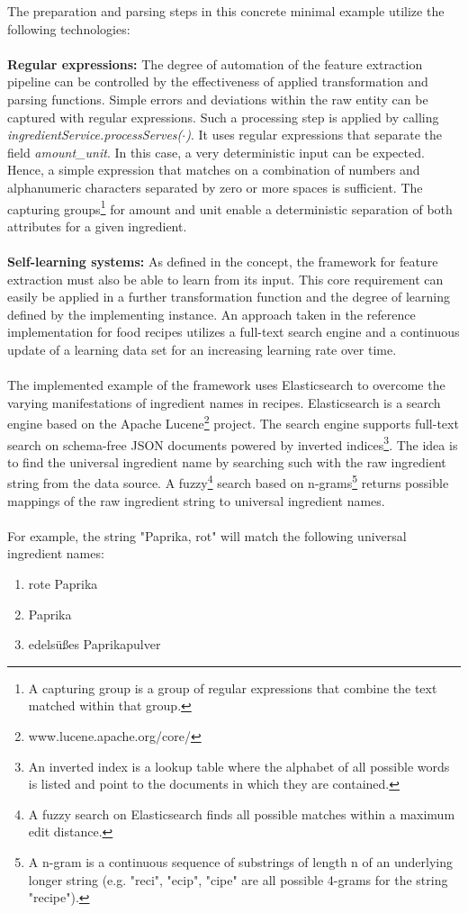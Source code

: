 \noindent The preparation and parsing steps in this concrete minimal example utilize the following technologies:
\\\\
\textbf{Regular expressions:}
The degree of automation of the feature extraction pipeline can be controlled by the effectiveness of applied transformation and parsing functions. Simple errors and deviations within the raw entity can be captured with regular expressions. Such a processing step is applied by calling \textit{ingredientService.processServes($\cdot$)}. It uses regular expressions that separate the field \textit{amount\_unit}. In this case, a very deterministic input can be expected. Hence, a simple expression that matches on a combination of numbers and alphanumeric characters separated by zero or more spaces is sufficient. The capturing groups\footnote{A capturing group is a group of regular expressions that combine the text matched within that group.} for amount and unit enable a deterministic separation of both attributes for a given ingredient.
\\\\
\textbf{Self-learning systems:}
As defined in the concept, the framework for feature extraction must also be able to learn from its input. This core requirement can easily be applied in a further transformation function and the degree of learning defined by the implementing instance. An approach taken in the reference implementation for food recipes utilizes a full-text search engine and a continuous update of a learning data set for an increasing learning rate over time. 
\\\\
The implemented example of the framework uses Elasticsearch \cite{elasticsearch_2017} to overcome the varying manifestations of ingredient names in recipes. Elasticsearch is a search engine based on the Apache Lucene\footnote{www.lucene.apache.org/core/} project. The search engine supports full-text search on schema-free JSON documents powered by inverted indices\footnote{An inverted index is a lookup table where the alphabet of all possible words is listed and point to the documents in which they are contained.}. The idea is to find the universal ingredient name by searching such with the raw ingredient string from the data source. A fuzzy\footnote{A fuzzy search on Elasticsearch finds all possible matches within a maximum edit distance.} search based on n-grams\footnote{A n-gram is a continuous sequence of substrings of length n of an underlying longer string (e.g. "reci", "ecip", "cipe" are all possible 4-grams for the string "recipe").} returns possible mappings of the raw ingredient string to universal ingredient names. 
\\\\
For example, the string "Paprika, rot" will match the following universal ingredient names:
\begin{enumerate}
\item rote Paprika
\item Paprika
\item edelsüßes Paprikapulver
\end{enumerate}

